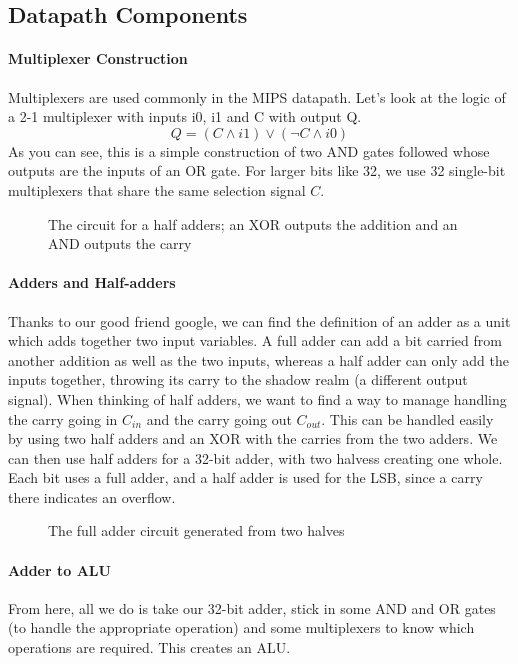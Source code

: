 \subsection{Datapath Components}
\paragraph{Multiplexer Construction} Multiplexers are used commonly in the MIPS datapath. Let's look at the logic of a 2-1 multiplexer with inputs i0, i1 and C with output Q. \[Q = (C \land i1) \lor (\neg C \land i0)\] As you can see, this is a simple construction of two AND gates followed whose outputs are the inputs of an OR gate. For larger bits like 32, we use 32 single-bit multiplexers that share the same selection signal $C$.
\begin{figure}[!htb]
	\caption{\label{fig:halfadderlogic} The circuit for a half adders; an XOR outputs the addition and an AND outputs the carry}
\end{figure}
\paragraph{Adders and Half-adders} Thanks to our good friend google, we can find the definition of an adder as a unit which adds together two input variables. A full adder can add a bit carried from another addition as well as the two inputs, whereas a half adder can only add the inputs together, throwing its carry to the shadow realm (a different output signal). When thinking of half adders, we want to find a way to manage handling the carry going in $C_{in}$ and the carry going out $C_{out}$. This can be handled easily by using two half adders and an XOR with the carries from the two adders. We can then use half adders for a 32-bit adder, with two halvess creating one whole. Each bit uses a full adder, and a half adder is used for the LSB, since a carry there indicates an overflow.
\begin{figure}[!htb]
	\caption{\label{fig:lsbadder} The full adder circuit generated from two halves}
\end{figure}
\paragraph{Adder to ALU}
From here, all we do is take our 32-bit adder, stick in some AND and OR gates (to handle the appropriate operation) and some multiplexers to know which operations are required. This creates an ALU.

